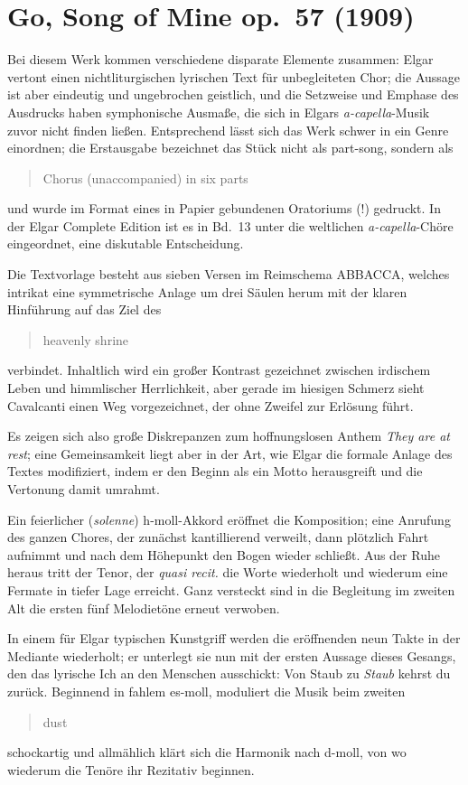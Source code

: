 \documentclass[a4paper,11pt,open=any]{scrbook}
\newcommand{\engquote}[1]{\foreignblockquote{english}{#1}}
\begin{document}
\section{Go, Song of Mine \textmd{op.~57 (1909)}}
Bei diesem Werk kommen verschiedene disparate Elemente zusammen: Elgar
vertont einen nichtliturgischen lyrischen Text für unbegleiteten Chor;
die Aussage ist aber eindeutig und ungebrochen geistlich, und die Setzweise
und Emphase des Ausdrucks haben symphonische Ausmaße, die sich in Elgars
\textit{a-capella}-Musik zuvor nicht finden ließen.  Entsprechend lässt
sich das Werk schwer in ein Genre einordnen; die Erstausgabe bezeichnet
das Stück nicht als part-song, sondern als \engquote{Chorus (unaccompanied)
in six parts} und wurde im Format eines in Papier gebundenen Oratoriums (!)
gedruckt\cite[Brief an A.~H. Littleton vom 27.~Juni 1909, in][Bd.~2, S.~724]
{elgar-publ}. In der Elgar Complete Edition ist es in Bd.~13\cite{ece13}
unter die weltlichen \textit{a-capella}-Chöre eingeordnet, eine diskutable
Entscheidung.

Die Textvorlage besteht aus sieben Versen im Reimschema \textsf{ABBACCA},
welches intrikat eine symmetrische Anlage um drei Säulen herum mit der
klaren Hinführung auf das Ziel des \engquote{heavenly shrine} verbindet.
Inhaltlich wird ein großer Kontrast gezeichnet zwischen irdischem Leben
und himmlischer Herrlichkeit, aber gerade im hiesigen Schmerz sieht
Cavalcanti einen Weg vorgezeichnet, der ohne Zweifel zur Erlösung führt.

Es zeigen sich also große Diskrepanzen zum hoffnungslosen Anthem \textit{They
are at rest}; eine Gemeinsamkeit liegt aber in der Art, wie Elgar die formale
Anlage des Textes modifiziert, indem er den Beginn als ein Motto herausgreift
und die Vertonung damit umrahmt.

Ein feierlicher (\textit{solenne}) h-moll-Akkord eröffnet die Komposition;
eine Anrufung des ganzen Chores, der zunächst kantillierend verweilt, dann
plötzlich Fahrt aufnimmt und nach dem Höhepunkt den Bogen wieder schließt.
Aus der Ruhe heraus tritt der Tenor, der \textit{quasi recit.} die Worte
wiederholt und wiederum eine Fermate in tiefer Lage erreicht.  Ganz versteckt
sind in die Begleitung im zweiten Alt die ersten fünf Melodietöne erneut
verwoben.

In einem für Elgar typischen Kunstgriff werden die eröffnenden neun Takte in
der Mediante wiederholt; er unterlegt sie nun mit der ersten Aussage dieses
Gesangs, den das lyrische Ich an den Menschen ausschickt: Von Staub zu
\emph{Staub} kehrst du zurück.  Beginnend in fahlem es-moll, moduliert die
Musik beim zweiten \engquote{dust} schockartig und allmählich klärt sich die
Harmonik nach d-moll, von wo wiederum die Tenöre ihr Rezitativ beginnen.
\end{document}
